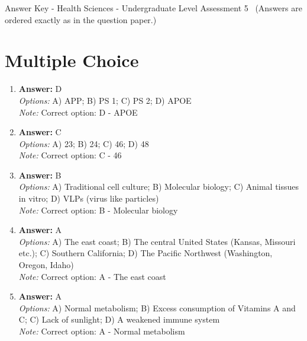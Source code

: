 \documentclass[12pt]{article}
\begin{document}
\begin{center}
Answer Key - Health Sciences - Undergraduate Level Assessment 5 \
\small (Answers are ordered exactly as in the question paper.)
\end{center}

\section*{Multiple Choice}
\begin{enumerate}[label=\arabic*.]
\item \textbf{Answer:} D
\\ \textit{Options:} A) APP; B) PS 1; C) PS 2; D) APOE
\\ \textit{Note:} Correct option: D - APOE
\item \textbf{Answer:} C
\\ \textit{Options:} A) 23; B) 24; C) 46; D) 48
\\ \textit{Note:} Correct option: C - 46
\item \textbf{Answer:} B
\\ \textit{Options:} A) Traditional cell culture; B) Molecular biology; C) Animal tissues in vitro; D) VLPs (virus like particles)
\\ \textit{Note:} Correct option: B - Molecular biology
\item \textbf{Answer:} A
\\ \textit{Options:} A) The east coast; B) The central United States (Kansas, Missouri etc.); C) Southern California; D) The Pacific Northwest (Washington, Oregon, Idaho)
\\ \textit{Note:} Correct option: A - The east coast
\item \textbf{Answer:} A
\\ \textit{Options:} A) Normal metabolism; B) Excess consumption of Vitamins A and C; C) Lack of sunlight; D) A weakened immune system
\\ \textit{Note:} Correct option: A - Normal metabolism
\end{enumerate}
\end{document}
